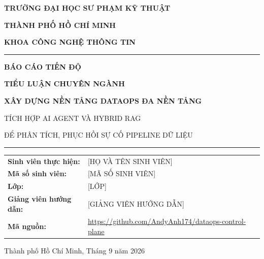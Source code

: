 \documentclass[12pt,a4paper,oneside]{report}
\newcommand{\StudentName}{[HỌ VÀ TÊN SINH VIÊN]}
\newcommand{\StudentID}{[MÃ SỐ SINH VIÊN]}
\newcommand{\ClassName}{[LỚP]}
\newcommand{\AdvisorName}{[GIẢNG VIÊN HƯỚNG DẪN]}
\newcommand{\ReportDate}{Tháng 9 năm 2026}
\begin{document}
\begin{titlepage}
  \begin{center}
    {\large\bfseries TRƯỜNG ĐẠI HỌC SƯ PHẠM KỸ THUẬT\par}
    {\large\bfseries THÀNH PHỐ HỒ CHÍ MINH\par}
    \vspace{0.35cm}
    {\large\bfseries KHOA CÔNG NGHỆ THÔNG TIN\par}

    \vspace{1.4cm}
    {\color{DataOpsBlue}\rule{0.72\textwidth}{1.2pt}\par}
    \vspace{0.8cm}
    {\LARGE\bfseries BÁO CÁO TIẾN ĐỘ\par}
    \vspace{0.25cm}
    {\Large\bfseries TIỂU LUẬN CHUYÊN NGÀNH\par}
    \vspace{0.8cm}
    {\Large\bfseries\color{DataOpsBlue}
      XÂY DỰNG NỀN TẢNG DATAOPS ĐA NỀN TẢNG\par
      TÍCH HỢP AI AGENT VÀ HYBRID RAG\par
      ĐỂ PHÂN TÍCH, PHỤC HỒI SỰ CỐ PIPELINE DỮ LIỆU\par}
    \vspace{0.8cm}
    {\color{DataOpsBlue}\rule{0.72\textwidth}{1.2pt}\par}

    \vfill
    \begin{tabular}{L{5.0cm} L{8.0cm}}
      \textbf{Sinh viên thực hiện:} & \StudentName \\
      \textbf{Mã số sinh viên:} & \StudentID \\
      \textbf{Lớp:} & \ClassName \\
      \textbf{Giảng viên hướng dẫn:} & \AdvisorName \\
      \textbf{Mã nguồn:} & \url{https://github.com/AndyAnh174/dataops-control-plane} \\
    \end{tabular}
    \vfill
    {\large Thành phố Hồ Chí Minh, \ReportDate\par}
  \end{center}
\end{titlepage}

\end{document}
